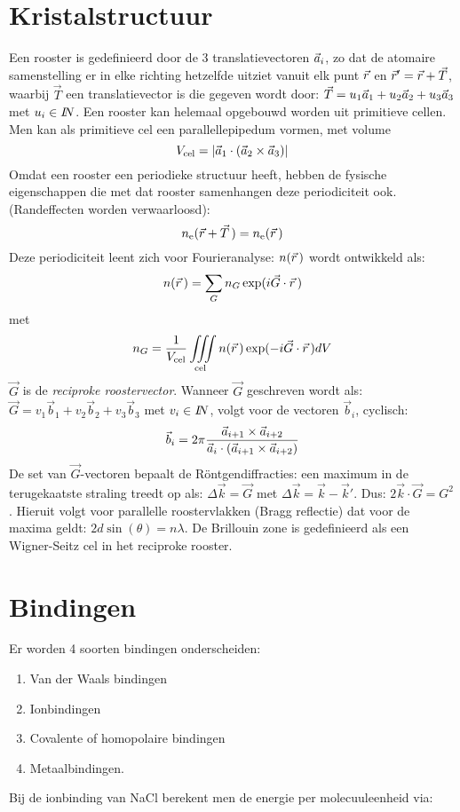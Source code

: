 \section{Kristalstructuur}
Een rooster is gedefinieerd door de 3 translatievectoren $\vec{a}_i$,
zo dat de atomaire samenstelling er in elke richting hetzelfde uitziet
vanuit elk punt $\vec{r}$ en $\vec{r}'=\vec{r}+\vec{T}$, waarbij
$\vec{T}$ een translatievector is die gegeven wordt door:
$\vec{T}=u_1\vec{a}_1+u_2\vec{a}_2+u_3\vec{a}_3$ met $u_i\in I\hspace{-1mm}N$.
Een rooster kan helemaal opgebouwd worden uit primitieve cellen.
Men kan als primitieve cel een parallellepipedum vormen, met volume
\[
V_{\rm cel}=|\vec{a}_1\cdot(\vec{a}_2\times\vec{a}_3)|
\]
Omdat een rooster een periodieke structuur heeft, hebben de fysische
eigenschappen die met dat rooster samenhangen deze periodiciteit ook.
(Randeffecten worden verwaarloosd):
\[
n_{\rm e}(\vec{r}+\vec{T}\,)=n_{\rm e}(\vec{r}\,)
\]
Deze periodiciteit leent zich voor Fourieranalyse: $n(\vec{r}\,)$
wordt ontwikkeld als:
\[
n(\vec{r}\,)=\sum\limits_G n_G\exp(i\vec{G}\cdot\vec{r}\,)
\]
met
\[
n_G=\frac{1}{V_{\rm cel}}\int\hspace{-2mm}\int\limits_{\rm cel}\hspace{-2mm}
\int n(\vvec{r})\exp(-i\vec{G}\cdot\vvec{r})dV
\]
$\vec{G}$ is de {\it reciproke roostervector}. Wanneer $\vec{G}$ geschreven
wordt als: $\vec{G}=v_1\vec{b}_1+v_2\vec{b}_2+v_3 \vec{b}_3$ met $v_i\in I\hspace{-1mm}N$,
volgt voor de vectoren $\vec{b}_i$, cyclisch:
\[
\vec{b}_i=2\pi\frac{\vec{a}_{i+1}\times\vec{a}_{i+2}}
{\vec{a}_i\cdot(\vec{a}_{i+1}\times\vec{a}_{i+2})}
\]
De set van $\vec{G}$-vectoren bepaalt de R\"ontgendiffracties: een
maximum in de terugekaatste straling treedt op als:
$\Delta\vec{k}=\vec{G}$ met $\Delta\vec{k}=\vec{k}-\vec{k}'$. Dus:
$2\vec{k}\cdot\vec{G}=G^2$. Hieruit volgt voor parallelle roostervlakken
(Bragg reflectie) dat voor de maxima geldt: $2d\sin(\theta)=n\lambda$.
\npar
De Brillouin zone is gedefinieerd als een Wigner-Seitz cel in het
reciproke rooster.

\section{Bindingen}
Er worden 4 soorten bindingen onderscheiden:
\begin{enumerate}
\item Van der Waals bindingen
\item Ionbindingen
\item Covalente of homopolaire bindingen
\item Metaalbindingen.
\end{enumerate}
Bij de ionbinding van NaCl berekent men de energie per molecuuleenheid via:

